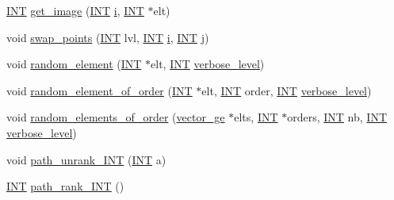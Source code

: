 \begin{DoxyCompactItemize}
\item 
\mbox{\hyperlink{galois_8h_a09fddde158a3a20bd2dcadb609de11dc}{I\+NT}} \mbox{\hyperlink{classsims_a7edd11da196628bd8f070786625e359d}{get\+\_\+image}} (\mbox{\hyperlink{galois_8h_a09fddde158a3a20bd2dcadb609de11dc}{I\+NT}} \mbox{\hyperlink{alphabet2_8_c_acb559820d9ca11295b4500f179ef6392}{i}}, \mbox{\hyperlink{galois_8h_a09fddde158a3a20bd2dcadb609de11dc}{I\+NT}} $\ast$elt)
\item 
void \mbox{\hyperlink{classsims_a3443b4bbfb5573864c29b627562819d2}{swap\+\_\+points}} (\mbox{\hyperlink{galois_8h_a09fddde158a3a20bd2dcadb609de11dc}{I\+NT}} lvl, \mbox{\hyperlink{galois_8h_a09fddde158a3a20bd2dcadb609de11dc}{I\+NT}} \mbox{\hyperlink{alphabet2_8_c_acb559820d9ca11295b4500f179ef6392}{i}}, \mbox{\hyperlink{galois_8h_a09fddde158a3a20bd2dcadb609de11dc}{I\+NT}} \mbox{\hyperlink{alphabet2_8_c_a37d972ae0b47b9099e30983131d31916}{j}})
\item 
void \mbox{\hyperlink{classsims_a28e72977652add0bb45a5f703243fd33}{random\+\_\+element}} (\mbox{\hyperlink{galois_8h_a09fddde158a3a20bd2dcadb609de11dc}{I\+NT}} $\ast$elt, \mbox{\hyperlink{galois_8h_a09fddde158a3a20bd2dcadb609de11dc}{I\+NT}} \mbox{\hyperlink{simeon_8_c_a818073fbcc2f439e7c56952f67386122}{verbose\+\_\+level}})
\item 
void \mbox{\hyperlink{classsims_a5813a13a4b5685f8bab7d248fb12cf57}{random\+\_\+element\+\_\+of\+\_\+order}} (\mbox{\hyperlink{galois_8h_a09fddde158a3a20bd2dcadb609de11dc}{I\+NT}} $\ast$elt, \mbox{\hyperlink{galois_8h_a09fddde158a3a20bd2dcadb609de11dc}{I\+NT}} order, \mbox{\hyperlink{galois_8h_a09fddde158a3a20bd2dcadb609de11dc}{I\+NT}} \mbox{\hyperlink{simeon_8_c_a818073fbcc2f439e7c56952f67386122}{verbose\+\_\+level}})
\item 
void \mbox{\hyperlink{classsims_af5aeca809be7c10df8493c1b9ef9e980}{random\+\_\+elements\+\_\+of\+\_\+order}} (\mbox{\hyperlink{classvector__ge}{vector\+\_\+ge}} $\ast$elts, \mbox{\hyperlink{galois_8h_a09fddde158a3a20bd2dcadb609de11dc}{I\+NT}} $\ast$orders, \mbox{\hyperlink{galois_8h_a09fddde158a3a20bd2dcadb609de11dc}{I\+NT}} nb, \mbox{\hyperlink{galois_8h_a09fddde158a3a20bd2dcadb609de11dc}{I\+NT}} \mbox{\hyperlink{simeon_8_c_a818073fbcc2f439e7c56952f67386122}{verbose\+\_\+level}})
\item 
void \mbox{\hyperlink{classsims_a8ae2ffa971c2aac809d83c18e4e91926}{path\+\_\+unrank\+\_\+\+I\+NT}} (\mbox{\hyperlink{galois_8h_a09fddde158a3a20bd2dcadb609de11dc}{I\+NT}} a)
\item 
\mbox{\hyperlink{galois_8h_a09fddde158a3a20bd2dcadb609de11dc}{I\+NT}} \mbox{\hyperlink{classsims_ad4cae0247047e591881fb8b8be40b540}{path\+\_\+rank\+\_\+\+I\+NT}} ()

\end{DoxyCompactItemize}
